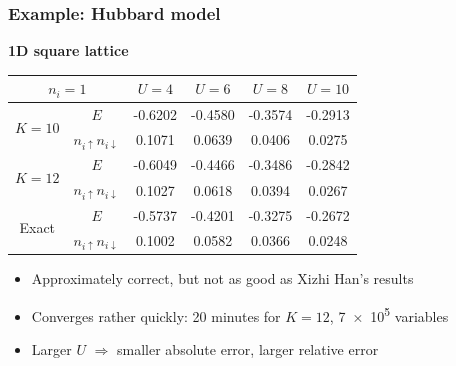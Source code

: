 \documentclass{beamer}
\begin{document}
\begin{frame}
\frametitle{Example: Hubbard model}

\textbf{1D square lattice}

\begin{center}
    \begin{tabular}{cccccc}
        \toprule
        \multicolumn{2}{c}{$n_i=1$}                                 & $U=4$   & $U=6$   & $U=8$   & $U=10$  \\
        \midrule
        \multirow{2}{*}{$K=10$} & $E$                               & -0.6202 & -0.4580 & -0.3574 & -0.2913  \\
                                & $n_{i \uparrow} n_{i \downarrow}$ &  0.1071 &  0.0639 &  0.0406 &  0.0275 \\
        \midrule
        \multirow{2}{*}{$K=12$} & $E$                               & -0.6049 & -0.4466 & -0.3486 & -0.2842  \\
                                & $n_{i \uparrow} n_{i \downarrow}$ &  0.1027 &  0.0618 &  0.0394 &  0.0267  \\
        \midrule
        \multirow{2}{*}{Exact}  & $E$                               & -0.5737 & -0.4201 & -0.3275 & -0.2672  \\
                                & $n_{i \uparrow} n_{i \downarrow}$ &  0.1002 &  0.0582 &  0.0366 &  0.0248  \\
        \bottomrule
    \end{tabular}
\end{center}

\begin{itemize}
    \item Approximately correct, but not as good as Xizhi Han's results
    \item Converges rather quickly: 20 minutes for $K=12$, \num{7e5} variables
    \item Larger $U$ $\Rightarrow$ smaller absolute error, larger relative error 
\end{itemize}

\end{frame}
\end{document}
